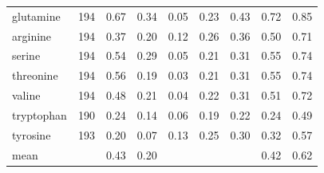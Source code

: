 \begin{table}[H]
\begin{tabular}{@{}lrrrrrrrr@{}}
    glutamine & 194 & 0.67 & 0.34 & 0.05 & 0.23 & 0.43 & 0.72 & 0.85 \\
    arginine & 194 & 0.37 & 0.20 & 0.12 & 0.26 & 0.36 & 0.50 & 0.71 \\
    serine & 194 & 0.54 & 0.29 & 0.05 & 0.21 & 0.31 & 0.55 & 0.74 \\
    threonine & 194 & 0.56 & 0.19 & 0.03 & 0.21 & 0.31 & 0.55 & 0.74 \\
    valine & 194 & 0.48 & 0.21 & 0.04 & 0.22 & 0.31 & 0.51 & 0.72 \\
    tryptophan & 190 & 0.24 & 0.14 & 0.06 & 0.19 & 0.22 & 0.24 & 0.49 \\
    tyrosine & 193 & 0.20 & 0.07 & 0.13 & 0.25 & 0.30 & 0.32 & 0.57 \\
    \hline
    mean & & 0.43 & 0.20 & & & & 0.42 & 0.62 \\
    \hline
  \end{tabular}
\end{table}
